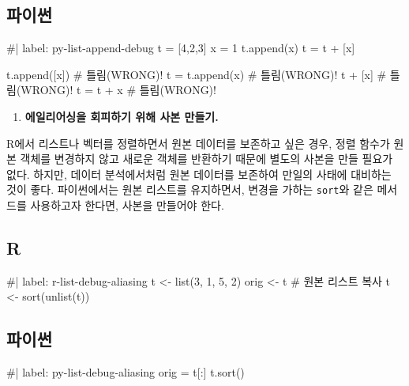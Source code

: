 \documentclass[
  letterpaper,
]{book}
\newenvironment{Shaded}{\begin{snugshade}}{\end{snugshade}}
\newcommand{\NormalTok}[1]{\textcolor[rgb]{0.00,0.23,0.31}{#1}}
\providecommand{\tightlist}{%
  \setlength{\itemsep}{0pt}\setlength{\parskip}{0pt}}\usepackage{longtable,booktabs,array}
\begin{document}
\subsection{파이썬}

\begin{Shaded}
\begin{Highlighting}[]
\NormalTok{\#| label: py{-}list{-}append{-}debug}
\NormalTok{t = [4,2,3]}
\NormalTok{x = 1}
\NormalTok{t.append(x)}
\NormalTok{t = t + [x]}

\NormalTok{t.append([x])     \# 틀림(WRONG)!}
\NormalTok{t = t.append(x)   \# 틀림(WRONG)!}
\NormalTok{t + [x]           \# 틀림(WRONG)!}
\NormalTok{t = t + x         \# 틀림(WRONG)!}
\end{Highlighting}
\end{Shaded}

\begin{enumerate}
\def\labelenumi{\arabic{enumi}.}
\setcounter{enumi}{1}
\tightlist
\item
  \textbf{에일리어싱을 회피하기 위해 사본 만들기.}
   
\end{enumerate}

R에서 리스트나 벡터를 정렬하면서 원본 데이터를 보존하고 싶은 경우, 정렬
함수가 원본 객체를 변경하지 않고 새로운 객체를 반환하기 때문에 별도의
사본을 만들 필요가 없다. 하지만, 데이터 분석에서처럼 원본 데이터를
보존하여 만일의 사태에 대비하는 것이 좋다. 파이썬에서는 원본 리스트를
유지하면서, 변경을 가하는 \texttt{sort}와 같은 메서드를 사용하고자
한다면, 사본을 만들어야 한다.

\subsection{R}

\begin{Shaded}
\begin{Highlighting}[]
\NormalTok{\#| label: r{-}list{-}debug{-}aliasing}
\NormalTok{t \textless{}{-} list(3, 1, 5, 2)}
\NormalTok{orig \textless{}{-} t  \# 원본 리스트 복사}
\NormalTok{t \textless{}{-} sort(unlist(t)) }
\end{Highlighting}
\end{Shaded}

\subsection{파이썬}

\begin{Shaded}
\begin{Highlighting}[]
\NormalTok{\#| label: py{-}list{-}debug{-}aliasing}
\NormalTok{orig = t[:]}
\NormalTok{t.sort()}
\end{Highlighting}
\end{Shaded}
\end{document}
